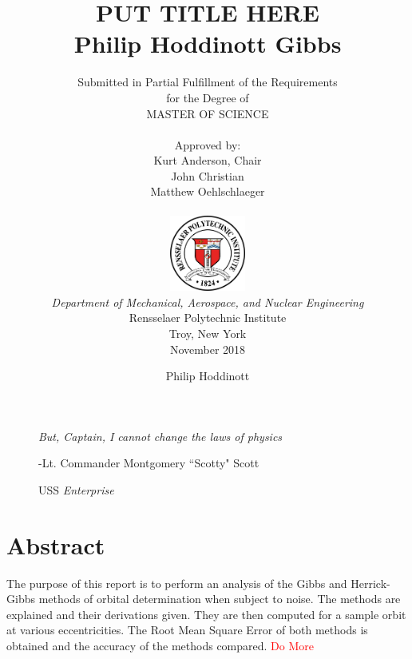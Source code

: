 \documentclass[12pt]{article}
\title{ 
		\LARGE \textbf{\uppercase{Put Title Here}} \\
		\vspace{0.25cm}
		\LARGE \textbf{Philip Hoddinott}
	}
\author{\small{Submitted in Partial Fulfillment of the Requirements} \\ \small{for the Degree of} \\
		\uppercase{Master of Science} \\ \\
		Approved by:
		\\ Kurt Anderson, Chair \\ John Christian \\ Matthew Oehlschlaeger \\ \\ %
		\includegraphics[width=2.5cm]{rensselaer_seal.png} \\
		\small{\textit{Department of Mechanical, Aerospace, and Nuclear Engineering}} \\
		\small{Rensselaer Polytechnic Institute} \\ 
		\small{Troy, New York} \\
		\small{November 2018}
	}
\newlength\longest
\begin{document}
		\title{Gibbs}
	\author{Philip Hoddinott}
	
	\maketitle
	\thispagestyle{empty}
	\clearpage
	
	\thispagestyle{empty}
	\null\vfill
	
	\begin{figure}[!t]
		\begin{center}
			\settowidth{}
			\parbox{\longest}{%
				\raggedright{\huge\itshape%
					But, Captain, I cannot change the laws of physics\par\bigskip
				}   
				\raggedleft\Large{-Lt. Commander Montgomery ``Scotty" Scott}\par
				\raggedleft\Large{USS}\textit{ Enterprise}\par%
				
			}
		\end{center}
	\end{figure}
	
	
	\null\vfill
	
	\newpage
	\setcounter{page}{1}
	\tableofcontents
	
	\newpage


	
	\listoftables
	\listoffigures
	
	\newpage
		\doublespacing

	
	
	\newpage
	\section{Abstract}
	The purpose of this report is to perform an analysis of the Gibbs and Herrick-Gibbs methods of orbital determination when subject to noise. The methods are explained and their derivations given. They are then computed for a sample orbit at various eccentricities. The Root Mean Square Error of both methods is obtained and the accuracy of the methods compared. 
	\textcolor{red}{ Do More}
	\newpage
\end{document}
